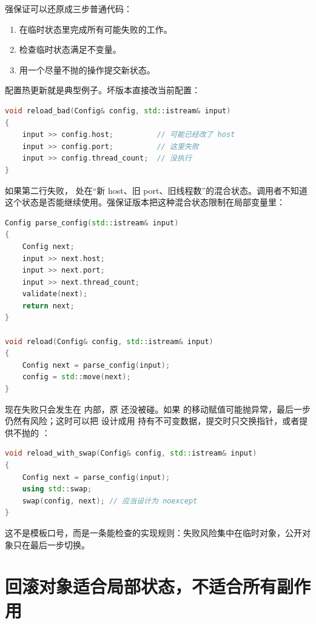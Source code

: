 强保证可以还原成三步普通代码：

\begin{enumerate}
  \item 在临时状态里完成所有可能失败的工作。
  \item 检查临时状态满足不变量。
  \item 用一个尽量不抛的操作提交新状态。
\end{enumerate}

配置热更新就是典型例子。坏版本直接改当前配置：

\begin{lstlisting}[language=C++,caption={半更新配置的失败路径}]
void reload_bad(Config& config, std::istream& input)
{
    input >> config.host;          // 可能已经改了 host
    input >> config.port;          // 这里失败
    input >> config.thread_count;  // 没执行
}
\end{lstlisting}

如果第二行失败， 处在“新 host、旧 port、旧线程数”的混合状态。调用者不知道这个状态是否能继续使用。强保证版本把这种混合状态限制在局部变量里：

\begin{lstlisting}[language=C++,caption={临时状态承担失败风险}]
Config parse_config(std::istream& input)
{
    Config next;
    input >> next.host;
    input >> next.port;
    input >> next.thread_count;
    validate(next);
    return next;
}

void reload(Config& config, std::istream& input)
{
    Config next = parse_config(input);
    config = std::move(next);
}
\end{lstlisting}

现在失败只会发生在  内部，原  还没被碰。如果  的移动赋值可能抛异常，最后一步仍然有风险；这时可以把  设计成用  持有不可变数据，提交时只交换指针，或者提供不抛的 ：

\begin{lstlisting}[language=C++,caption={用不抛 swap 提交}]
void reload_with_swap(Config& config, std::istream& input)
{
    Config next = parse_config(input);
    using std::swap;
    swap(config, next); // 应当设计为 noexcept
}
\end{lstlisting}

这不是模板口号，而是一条能检查的实现规则：失败风险集中在临时对象，公开对象只在最后一步切换。

\section{回滚对象适合局部状态，不适合所有副作用}

